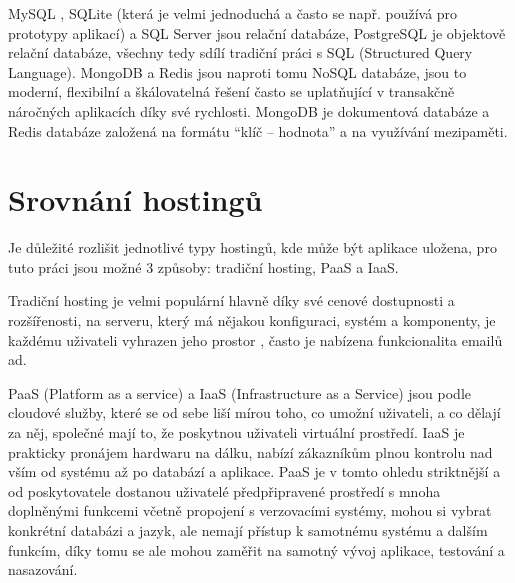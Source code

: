     MySQL \cite{db1}, SQLite \cite{db2} (která je velmi jednoduchá a často se např. používá pro prototypy aplikací) a SQL Server jsou relační databáze, PostgreSQL \cite{db3} je objektově relační databáze, všechny tedy sdílí tradiční práci s SQL (Structured Query Language). MongoDB \cite{db4} a Redis \cite{db5} jsou naproti tomu NoSQL databáze, jsou to moderní, flexibilní a škálovatelná řešení často se uplatňující v transakčně náročných aplikacích díky své rychlosti. MongoDB je dokumentová databáze a Redis databáze založená na formátu \enquote{klíč -- hodnota} a na využívání mezipaměti.
    
    
    \section{Srovnání hostingů}
    Je důležité rozlišit jednotlivé typy hostingů, kde může být aplikace uložena, pro tuto práci jsou možné 3 způsoby: tradiční hosting, PaaS a IaaS.
    
    Tradiční hosting je velmi populární hlavně díky své cenové dostupnosti a rozšířenosti, na serveru, který má nějakou konfiguraci, systém a komponenty, je každému uživateli vyhrazen jeho prostor \cite{hosting2}, často je nabízena funkcionalita emailů ad.
    
    PaaS (Platform as a service) a IaaS (Infrastructure as a Service) jsou podle \cite{hosting1} cloudové služby, které se od sebe liší mírou toho, co umožní uživateli, a co dělají za něj, společné mají to, že poskytnou uživateli virtuální prostředí. IaaS je prakticky pronájem hardwaru na dálku, nabízí zákazníkům plnou kontrolu nad vším od systému až po databází a aplikace. PaaS je v tomto ohledu striktnější a od poskytovatele dostanou uživatelé předpřipravené prostředí s mnoha doplněnými funkcemi včetně propojení s verzovacími systémy, mohou si vybrat konkrétní databázi a jazyk, ale nemají přístup k samotnému systému a dalším funkcím, díky tomu se ale mohou zaměřit na samotný vývoj aplikace, testování a nasazování.
    
